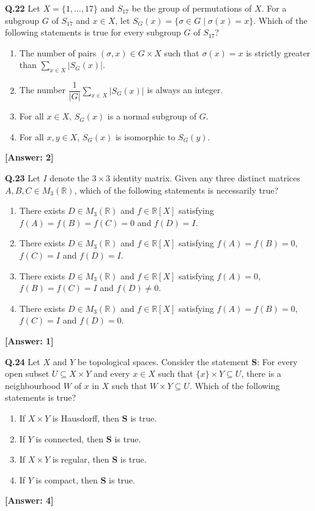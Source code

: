 \documentclass[12pt,a4paper]{article}
\newcommand{\ans}[1]{\quad\textcolor{anscolor}{\textbf{[Answer: #1]}}}
\begin{document}
\textbf{Q.22} Let $X=\{1,\ldots,17\}$ and $S_{17}$ be the group of permutations of $X$. For a subgroup $G$ of $S_{17}$ and $x\in X$, let $S_G(x)=\{\sigma\in G\mid\sigma(x)=x\}$. Which of the following statements is true for every subgroup $G$ of $S_{17}$?
\begin{enumerate}[label=\arabic*.]
\item The number of pairs $(\sigma,x)\in G\times X$ such that $\sigma(x)=x$ is strictly greater than $\displaystyle\sum_{x\in X}|S_G(x)|$.
\item The number $\dfrac{1}{|G|}\displaystyle\sum_{x\in X}|S_G(x)|$ is always an integer.
\item For all $x\in X$, $S_G(x)$ is a normal subgroup of $G$.
\item For all $x,y\in X$, $S_G(x)$ is isomorphic to $S_G(y)$.
\end{enumerate}\ans{2}

\textbf{Q.23} Let $I$ denote the $3\times3$ identity matrix. Given any three distinct matrices $A,B,C\in M_3(\mathbb{R})$, which of the following statements is necessarily true?
\begin{enumerate}[label=\arabic*.]
\item There exists $D\in M_3(\mathbb{R})$ and $f\in\mathbb{R}[X]$ satisfying $f(A)=f(B)=f(C)=0$ and $f(D)=I$.
\item There exists $D\in M_3(\mathbb{R})$ and $f\in\mathbb{R}[X]$ satisfying $f(A)=f(B)=0$, $f(C)=I$ and $f(D)=I$.
\item There exists $D\in M_3(\mathbb{R})$ and $f\in\mathbb{R}[X]$ satisfying $f(A)=0$, $f(B)=f(C)=I$ and $f(D)\neq0$.
\item There exists $D\in M_3(\mathbb{R})$ and $f\in\mathbb{R}[X]$ satisfying $f(A)=f(B)=0$, $f(C)=I$ and $f(D)=0$.
\end{enumerate}\ans{1}

\textbf{Q.24} Let $X$ and $Y$ be topological spaces. Consider the statement \textbf{S}: For every open subset $U\subseteq X\times Y$ and every $x\in X$ such that $\{x\}\times Y\subseteq U$, there is a neighbourhood $W$ of $x$ in $X$ such that $W\times Y\subseteq U$. Which of the following statements is true?
\begin{enumerate}[label=\arabic*.]
\item If $X\times Y$ is Hausdorff, then \textbf{S} is true.
\item If $Y$ is connected, then \textbf{S} is true.
\item If $X\times Y$ is regular, then \textbf{S} is true.
\item If $Y$ is compact, then \textbf{S} is true.
\end{enumerate}\ans{4}
\end{document}
